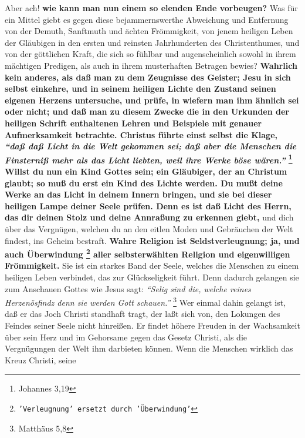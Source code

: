 Aber ach! \textbf{wie kann man nun einem so elenden Ende vorbeugen?} Was für ein
Mittel
giebt es gegen diese bejammernswerthe Abweichung und Entfernung von der Demuth,
Sanftmuth und ächten Frömmigkeit, von jenem heiligen Leben der Gläubigen in den
ersten und reinsten Jahrhunderten des Christenthumes, und von der göttlichen
Kraft, die sich so fühlbar und augenscheinlich sowohl in ihrem mächtigen
Predigen, als auch in ihrem musterhaften Betragen bewies? \textbf{Wahrlich kein
anderes,
als daß man zu dem Zeugnisse des Geister; Jesu in sich
selbst einkehre, und in
seinem heiligen Lichte den Zustand seinen eigenen Herzens untersuche, und prüfe,
in wiefern man ihm ähnlich sei oder nicht; und daß man zu diesem Zwecke die in
den Urkunden der heiligen Schrift enthaltenen Lehren und
Beispiele mit genauer
Aufmerksamkeit betrachte. Christus führte einst selbst die Klage,
\textit{"`daß daß
Licht in die Welt gekommen sei; daß aber die Menschen die Finsterniß mehr als
das Licht liebten, weil ihre Werke böse wären."'}
\footnote{Johannes 3,19}
Willst du
nun ein Kind Gottes sein; ein Gläubiger, der an Christum
glaubt; so muß du erst
ein Kind des Lichte werden. Du mußt deine Werke an das
Licht in deinem Innern
bringen, und sie bei dieser heiligen Lampe deiner Seele prüfen. Denn es ist daß
Licht des Herrn, das dir deinen Stolz und deine Annraßung zu erkennen giebt,}
und
dich über das Vergnügen, welchen du an den eitlen Moden und
Gebräuchen der Welt
findest, ins Geheim bestraft. \textbf{Wahre Religion ist Seldstverleugnung; ja,
und auch Überwindung
\footnote{\texttt{'Verleugnung' ersetzt durch 'Überwindung'}}
aller selbsterwählten Religion und eigenwilligen Frömmigkeit.} Sie
ist ein starkes Band der Seele, welches die Menschen zu einem heiligen Leben
verbindet, das zur Glückseligkeit führt. Denn dadurch gelangen sie zum Anschauen
Gottes wie Jesus sagt:
\textit{"`Selig sind die, welche reines Herzenösfindz denn sie
werden Gott schauen."'}
\footnote{Matthäus 5,8}
Wer einmal dahin gelangt ist, daß
er das Joch Christi standhaft tragt, der laßt sich von, den Lokungen des Feindes
seiner Seele nicht hinreißen. Er findet höhere Freuden in der Wachsamkeit über
sein Herz und im Gehorsame gegen das Gesetz Christi, als die Vergnügungen der
Welt ihm darbieten können. Wenn die Menschen wirklich das Kreuz Christi, seine
